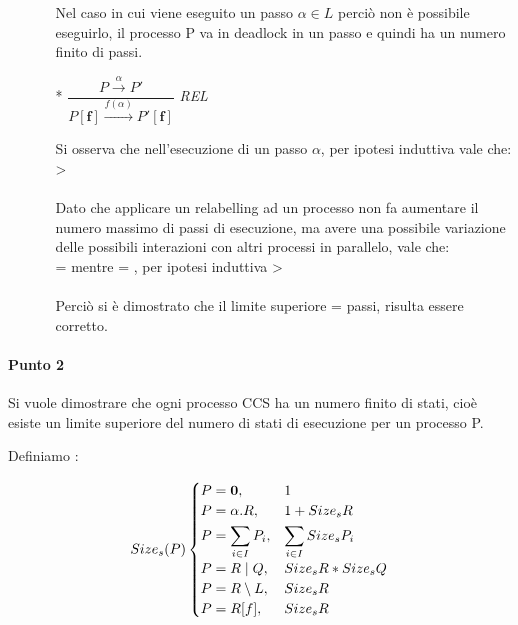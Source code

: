\begin{itemize}
\begin{itemize}
			Nel caso in cui viene eseguito un passo $\alpha \in L$ perciò non è possibile eseguirlo, il processo P va in deadlock in un passo e quindi ha un numero finito di passi. 
		\\
		\item[*]
			$\dfrac{P \overset{\alpha}\rightarrow P'}{P \mathbf{[f]} \overset{f(\alpha)}\rightarrow P'\mathbf{[f]}}$ \textit{REL} 
			
			Si osserva che nell'esecuzione di un passo $\alpha$, per ipotesi induttiva vale che: \sip{P} >   \\
			\\
			Dato che applicare un relabelling ad un processo non fa aumentare il numero massimo di passi di esecuzione, ma avere una possibile variazione delle possibili interazioni con altri processi in parallelo, vale che:\\  =  mentre  = , per ipotesi induttiva  > \\
			\\
		Perciò si è dimostrato che il limite superiore  =  passi, risulta essere corretto.	
				
	\end{itemize}

	
\end{itemize}

\paragraph{Punto 2} \mbox{}

Si vuole dimostrare che ogni processo CCS ha un numero finito di stati, cioè esiste un limite superiore del numero di stati di esecuzione per un processo P.

Definiamo :

\[
Size_{s}(P)
\begin{cases}
P=\mathbf{0}, 			& 1							\\
P=\alpha.R,     & 1+Size_{s}{R}                \\
P=\displaystyle\sum_{i\in I}^{}P_{i},          & \displaystyle\sum_{i\in I}^{}Size_{s}{P_{i}} \\
P=R\mid Q,      & Size_{s}{R}*Size_{s}{Q}       \\
P=R\setminus L, & Size_{s}{R}                  \\
P=R[f],         & Size_{s}{R}
\end{cases}
\]

